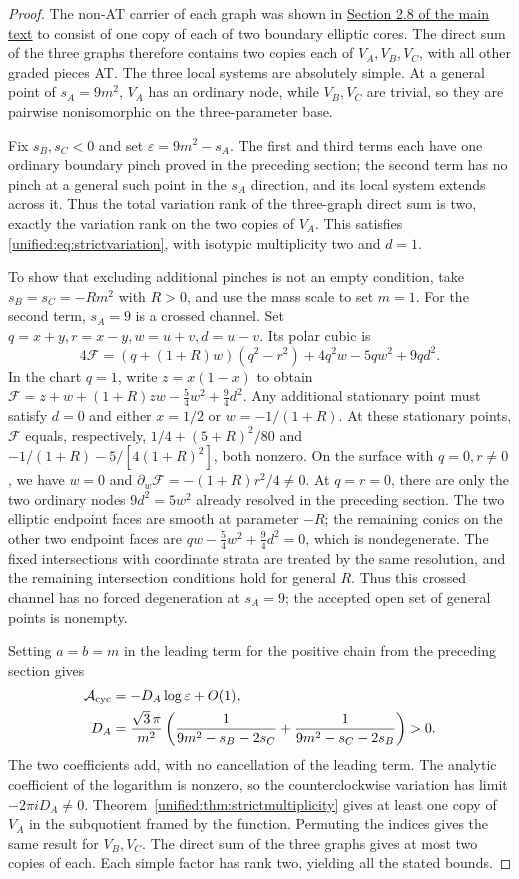 \documentclass[11pt,a4paper,oneside]{article}
\theoremstyle{plain}
\theoremstyle{definition}
\theoremstyle{remark}
\numberwithin{equation}{section}
\newcommand{\otherref}[2]{\href{#1.pdf}{#2}}
\begin{document}
\begin{proof}
The non-AT carrier of each graph was shown in \otherref{feynman_periods_long_paper_en}{Section 2.8 of the main text} to consist of one copy of each of two boundary elliptic cores.
The direct sum of the three graphs therefore contains two copies each of $V_A,V_B,V_C$, with all other graded pieces AT.
The three local systems are absolutely simple. At a general point of $s_A=9m^2$, $V_A$ has an ordinary node,
while $V_B,V_C$ are trivial, so they are pairwise nonisomorphic on the three-parameter base.

Fix $s_B,s_C<0$ and set $\varepsilon=9m^2-s_A$.
The first and third terms each have one ordinary boundary pinch proved in the preceding section;
the second term has no pinch at a general such point in the $s_A$ direction, and its local system extends across it.
Thus the total variation rank of the three-graph direct sum is two, exactly the variation rank on the two copies of $V_A$.
This satisfies \eqref{unified:eq:strictvariation}, with isotypic multiplicity two and $d=1$.

To show that excluding additional pinches is not an empty condition, take $s_B=s_C=-Rm^2$ with $R>0$,
and use the mass scale to set $m=1$. For the second term, $s_A=9$ is a crossed channel.
Set $q=x+y,r=x-y,w=u+v,d=u-v$. Its polar cubic is
\[
 4\mathcal F=(q+(1+R)w)(q^2-r^2)+4q^2w-5qw^2+9qd^2.
\]
In the chart $q=1$, write $z=x(1-x)$ to obtain
$\mathcal F=z+w+(1+R)zw-\frac54w^2+\frac94d^2$.
Any additional stationary point must satisfy $d=0$ and either $x=1/2$ or $w=-1/(1+R)$.
At these stationary points, $\mathcal F$ equals, respectively,
$1/4+(5+R)^2/80$ and $-1/(1+R)-5/[4(1+R)^2]$, both nonzero.
On the surface with $q=0,r\ne0$, we have $w=0$ and
$\partial_w\mathcal F=-(1+R)r^2/4\ne0$.
At $q=r=0$, there are only the two ordinary nodes $9d^2=5w^2$ already resolved in the preceding section.
The two elliptic endpoint faces are smooth at parameter $-R$; the remaining conics on the other two endpoint faces are
$qw-\frac54w^2+\frac94d^2=0$, which is nondegenerate.
The fixed intersections with coordinate strata are treated by the same resolution, and the remaining intersection conditions hold for general $R$.
Thus this crossed channel has no forced degeneration at $s_A=9$; the accepted open set of general points is nonempty.

Setting $a=b=m$ in the leading term for the positive chain from the preceding section gives
\begin{align*}
 \mathcal A_{\rm cyc}
   &=-D_A\log\varepsilon+O(1),\\
 D_A&=\frac{\sqrt3\,\pi}{m^2}
       \left(\frac1{9m^2-s_B-2s_C}
             +\frac1{9m^2-s_C-2s_B}\right)>0 .
\end{align*}
The two coefficients add, with no cancellation of the leading term. The analytic coefficient of the logarithm is nonzero,
so the counterclockwise variation has limit $-2\pi iD_A\ne0$.
Theorem~\ref{unified:thm:strictmultiplicity} gives at least one copy of $V_A$ in the subquotient framed by the function.
Permuting the indices gives the same result for $V_B,V_C$. The direct sum of the three graphs gives at most two copies of each.
Each simple factor has rank two, yielding all the stated bounds.
\end{proof}
\end{document}
